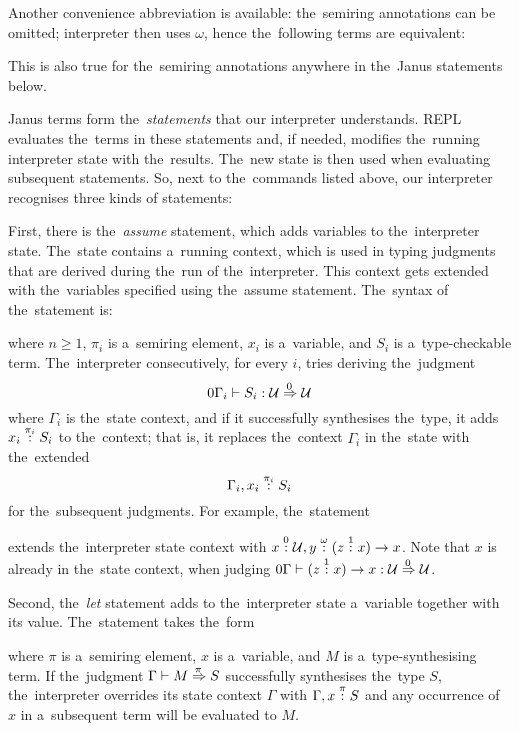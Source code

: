Another convenience abbreviation is available: the~semiring annotations can be
omitted; interpreter then uses $\omega$, hence the~following terms are
equivalent:
\begin{center}
   \hspace{6em}
\end{center}
This is also true for the~semiring annotations anywhere in the~Janus statements
below.

Janus terms form the~\emph{statements} that our interpreter understands. REPL
evaluates the~terms in these statements and, if needed, modifies the~running
interpreter state with the~results. The~new state is then used when evaluating
subsequent statements. So, next to the~commands listed above, our interpreter
recognises three kinds of statements:

First, there is the~\emph{assume} statement, which adds variables to
the~interpreter state. The~state contains a~running context, which is used in
typing judgments that are derived during the~run of the~interpreter. This
context gets extended with the~variables specified using the~assume statement.
The~syntax of the~statement is:
\begin{center}
\end{center}
where $n \geq 1$, $\pi_i$ is a~semiring element, $x_i$ is a~variable, and $S_i$
is a~type-checkable term. The~interpreter consecutively, for every $i$, tries
deriving the~judgment
\[
  0\Gamma_i \vdash S_i \overset{}: \mathcal{U} \overset{\!{0}}\Rightarrow \mathcal{U}
\]
where $\Gamma_i$ is the~state context, and if it successfully synthesises
the~type, it adds $x_i \overset{\pi_i}: S_i$ to the~context; that is, it replaces
the~context $\Gamma_i$ in the~state with the~extended
\[
  \Gamma_i, x_i \overset{\pi_i}: S_i
\]
for the~subsequent judgments. For example, the~statement
\begin{center}
\end{center}
extends the~interpreter state context with $x \overset{0}: \mathcal{U}, y \overset{\omega}:
(z \overset{1}: x) \to x$. Note that $x$ is already in the~state context, when judging
$0\Gamma \vdash (z \overset{1}: x) \to x \overset{}: \mathcal{U} \overset{\!{0}}\Rightarrow \mathcal{U}$.

Second, the~\emph{let} statement adds to the~interpreter state a~variable
together with its value. The~statement takes the~form
\begin{center}
\end{center}
where $\pi$ is a~semiring element, $x$ is a~variable, and $M$ is
a~type-synthesising term. If the~judgment $\Gamma \vdash M \overset{\!{\pi}}\Rightarrow S$
successfully synthesises the~type $S$, the~interpreter overrides its state
context $\Gamma$ with $\Gamma, x \overset{\pi}: S$ and any occurrence of $x$ in
a~subsequent term will be evaluated to $M$.

